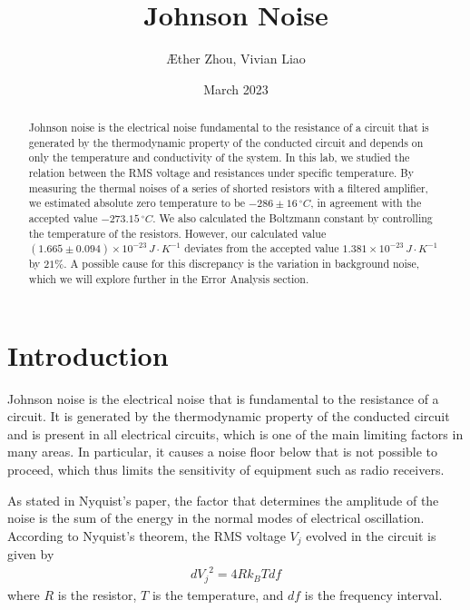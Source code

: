 \documentclass[12pt]{article}
\title{Johnson Noise}
\author{\AE ther Zhou, Vivian Liao }
\date{March 2023}
\begin{document}
\maketitle

\begin{abstract}
\quad Johnson noise is the electrical noise fundamental to the resistance of a circuit that is generated by the thermodynamic property of the conducted circuit and depends on only the temperature and conductivity of the system. In this lab, we studied the relation between the RMS voltage and resistances under specific temperature. By measuring the thermal noises of a series of shorted resistors with a filtered amplifier, we estimated absolute zero temperature to be $-286 \pm 16 \,\si{^\circ C}$, in agreement with the accepted value $-273.15\,\si{^\circ C}$. We also calculated the Boltzmann constant by controlling the temperature of the resistors. However, our calculated value $(1.665\pm 0.094)\times 10^{-23}\,\si{J\cdot K^{-1}}$ deviates from the accepted value $1.381\times 10^{-23}\,\si{J\cdot K^{-1}}$ by $21\%$. A possible cause for this discrepancy is the variation in background noise, which we will explore further in the Error Analysis section. 

\end{abstract}

\newpage

\section{Introduction}

\quad Johnson noise is the electrical noise that is fundamental to the resistance of a circuit. It is generated by the thermodynamic property of the conducted circuit and is present in all electrical circuits, which is one of the main limiting factors in many areas. In particular, it causes a noise floor below that is not possible to proceed, which thus limits the sensitivity of equipment such as radio receivers.

As stated in Nyquist's paper, the factor that determines the amplitude of the noise is the sum of the energy in the normal modes of electrical oscillation. According to Nyquist's theorem, the RMS voltage $V_j$ evolved in the circuit is given by
\begin{gather}
d{V_j}^{2}=4Rk_BTdf
\label{eqn:nyquist's theorem}
\end{gather}
where $R$ is the resistor, $T$ is the temperature, and $df$ is the frequency interval.
\end{document}
